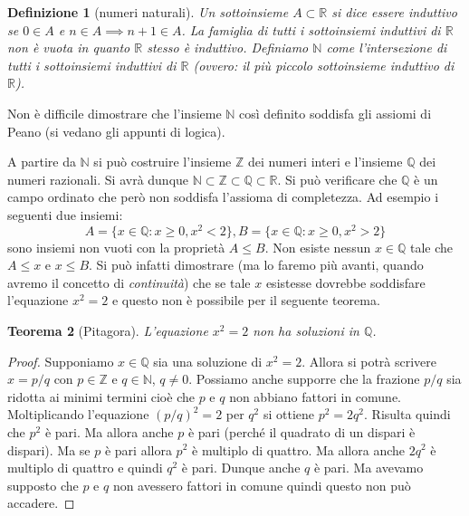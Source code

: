 \documentclass[italian,a4paper,oneside,headinclude]{scrbook}
\newcommand{\NN}{\mathbb N}
\newcommand{\QQ}{\mathbb Q}
\newcommand{\RR}{\mathbb R}
\newcommand{\ZZ}{\mathbb Z}
\newtheorem{theorem}{Teorema}
\newtheorem{definition}[theorem]{Definizione}
\begin{document}
\begin{definition}[numeri naturali]
Un sottoinsieme $A\subset \RR$ si dice essere \emph{induttivo}
se $0\in A$ e $n\in A \implies n+1 \in A$.
La famiglia di tutti i sottoinsiemi induttivi di $\RR$ non è vuota
in quanto $\RR$ stesso è induttivo. Definiamo $\NN$ come l'intersezione
di tutti i sottoinsiemi induttivi di $\RR$ (ovvero: il più piccolo sottoinsieme induttivo di $\RR$).
\end{definition}

Non è difficile dimostrare che l'insieme $\NN$ così definito
soddisfa gli assiomi di Peano (si vedano gli appunti di logica).

A partire da $\NN$ si può costruire l'insieme $\ZZ$ dei numeri interi
e l'insieme $\QQ$ dei numeri razionali. Si avrà dunque $\NN \subset \ZZ \subset \QQ \subset \RR$.
Si può verificare che $\QQ$ è un campo ordinato che però non soddisfa l'assioma di completezza.
Ad esempio i seguenti due insiemi:
\[
  A= \{x\in \QQ\colon x\ge 0, x^2 < 2\},
  B = \{x\in \QQ\colon x\ge 0, x^2 > 2\}
\]
sono insiemi non vuoti con la proprietà $A\le B$.
Non esiste nessun $x\in \QQ$ tale che $A\le x$ e $x\le B$.
Si può infatti dimostrare (ma lo faremo più avanti, quando avremo il concetto di \emph{continuità}) che se tale $x$ esistesse dovrebbe
soddisfare l'equazione $x^2=2$ e questo non è possibile per il seguente
teorema.

\begin{theorem}[Pitagora]
L'equazione $x^2=2$ non ha soluzioni in $\QQ$.
\end{theorem}
%
\begin{proof}
Supponiamo $x\in \QQ$ sia una soluzione di $x^2=2$.
Allora si potrà scrivere $x=p/q$ con $p\in \ZZ$ e $q\in \NN$, $q\neq 0$.
Possiamo anche supporre che la frazione $p/q$ sia ridotta ai minimi
termini cioè che $p$ e $q$ non abbiano fattori in comune.
Moltiplicando l'equazione
$(p/q)^2=2$ per $q^2$ si ottiene $p^2 = 2 q^2$.
Risulta quindi che $p^2$ è pari.
Ma allora anche $p$ è pari (perché il quadrato di un dispari è dispari).
Ma se $p$ è pari allora $p^2$ è multiplo di quattro.
Ma allora anche $2q^2$ è multiplo di quattro e quindi $q^2$ è pari.
Dunque anche $q$ è pari. Ma avevamo supposto che $p$ e $q$ non avessero
fattori in comune quindi questo non può accadere.
\end{proof}
\end{document}
